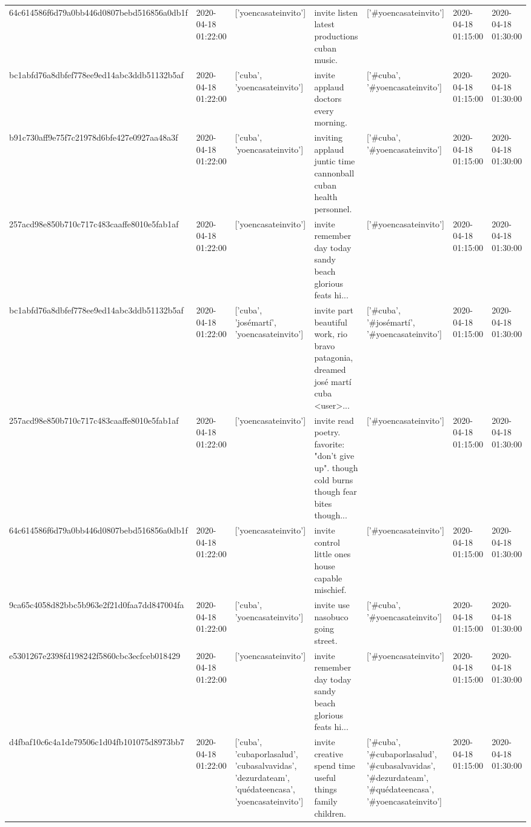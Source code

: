 \begin{tabular}{lllllll}
64c614586f6d79a0bb446d0807bebd516856a0db1f & 2020-04-18 01:22:00 & ['yoencasateinvito'] & invite listen latest productions cuban music. & ['#yoencasateinvito'] & 2020-04-18 01:15:00 & 2020-04-18 01:30:00 \\
bc1abfd76a8dbfef778ee9ed14abc3ddb51132b5af & 2020-04-18 01:22:00 & ['cuba', 'yoencasateinvito'] & invite applaud doctors every morning. & ['#cuba', '#yoencasateinvito'] & 2020-04-18 01:15:00 & 2020-04-18 01:30:00 \\
b91c730aff9e75f7c21978d6bfe427e0927aa48a3f & 2020-04-18 01:22:00 & ['cuba', 'yoencasateinvito'] & inviting applaud juntic time cannonball cuban health personnel. & ['#cuba', '#yoencasateinvito'] & 2020-04-18 01:15:00 & 2020-04-18 01:30:00 \\
257acd98e850b710c717c483caaffe8010e5fab1af & 2020-04-18 01:22:00 & ['yoencasateinvito'] & invite remember day today sandy beach glorious feats hi... & ['#yoencasateinvito'] & 2020-04-18 01:15:00 & 2020-04-18 01:30:00 \\
bc1abfd76a8dbfef778ee9ed14abc3ddb51132b5af & 2020-04-18 01:22:00 & ['cuba', 'josémartí', 'yoencasateinvito'] & invite part beautiful work, rio bravo patagonia, dreamed josé martí cuba <user>... & ['#cuba', '#josémartí', '#yoencasateinvito'] & 2020-04-18 01:15:00 & 2020-04-18 01:30:00 \\
257acd98e850b710c717c483caaffe8010e5fab1af & 2020-04-18 01:22:00 & ['yoencasateinvito'] & invite read poetry. favorite: "don't give up". though cold burns though fear bites though... & ['#yoencasateinvito'] & 2020-04-18 01:15:00 & 2020-04-18 01:30:00 \\
64c614586f6d79a0bb446d0807bebd516856a0db1f & 2020-04-18 01:22:00 & ['yoencasateinvito'] & invite control little ones house capable mischief. & ['#yoencasateinvito'] & 2020-04-18 01:15:00 & 2020-04-18 01:30:00 \\
9ca65c4058d82bbc5b963e2f21d0faa7dd847004fa & 2020-04-18 01:22:00 & ['cuba', 'yoencasateinvito'] & invite use nasobuco going street. & ['#cuba', '#yoencasateinvito'] & 2020-04-18 01:15:00 & 2020-04-18 01:30:00 \\
e5301267e2398fd198242f5860cbc3ecfceb018429 & 2020-04-18 01:22:00 & ['yoencasateinvito'] & invite remember day today sandy beach glorious feats hi... & ['#yoencasateinvito'] & 2020-04-18 01:15:00 & 2020-04-18 01:30:00 \\
d4fbaf10c6c4a1de79506c1d04fb101075d8973bb7 & 2020-04-18 01:22:00 & ['cuba', 'cubaporlasalud', 'cubasalvavidas', 'dezurdateam', 'quédateencasa', 'yoencasateinvito'] & invite creative spend time useful things family children. & ['#cuba', '#cubaporlasalud', '#cubasalvavidas', '#dezurdateam', '#quédateencasa', '#yoencasateinvito'] & 2020-04-18 01:15:00 & 2020-04-18 01:30:00 \\

\end{tabular}
